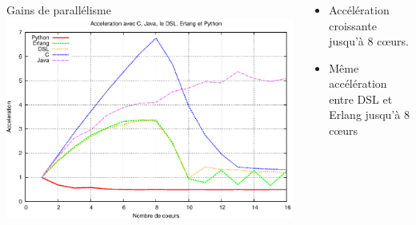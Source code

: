 \documentclass[10pt]{beamer}
\begin{document}
\begin{frame}%
\frametitle{}
\begin{columns}[T]
    \begin{column}{.65\textwidth}
      \begin{block}{Gains de parallélisme}
	\includegraphics[scale=0.24]{images/kar_idro_speedup_same_scale}
      \end{block}
    \end{column}
    \begin{column}{.3\textwidth}
      \begin{itemize}
       \item Accélération croissante jusqu'à 8 c\oe urs.
       \item Même accélération entre DSL et Erlang jusqu'à 8 c\oe urs
      \end{itemize}

    \end{column}
  \end{columns}
\end{frame}
\end{document}
